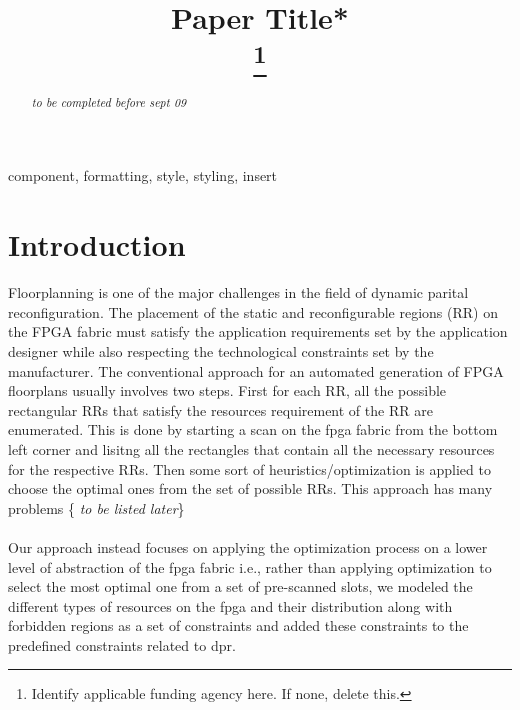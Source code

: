 \documentclass[conference]{IEEEtran}
\title{Paper Title*\\
\thanks{Identify applicable funding agency here. If none, delete this.}
}
\begin{document}
\author{
}

\maketitle

\begin{abstract}
\textit{\color{red} to be completed before sept 09}

\end{abstract}

\begin{IEEEkeywords}
component, formatting, style, styling, insert
\end{IEEEkeywords}

\section{Introduction}
Floorplanning is one of the major challenges in the field of dynamic parital reconfiguration. The placement of the static and reconfigurable regions (RR) on the FPGA fabric must satisfy the application requirements set by the application designer while also respecting the technological constraints set by the manufacturer. The conventional approach for an automated generation of FPGA floorplans usually involves two steps. First for each RR, all the possible rectangular RRs that satisfy the resources requirement of the RR are enumerated. This is done by starting a scan on the fpga fabric from the bottom left corner and lisitng all the rectangles that contain all the necessary resources for the respective RRs. Then some sort of heuristics/optimization is applied to choose the optimal ones from the set of possible RRs. This approach has many problems \{\textit{ \color{red}to be listed later}\}\\\\

Our approach instead focuses on applying the optimization process on a lower level of abstraction of the fpga fabric i.e., rather than applying optimization to select the most optimal one from a set of pre-scanned slots, we modeled the different types of resources on the fpga and their distribution along with forbidden regions as a set of constraints and added these constraints to the predefined constraints related to dpr. \\
\end{document}
